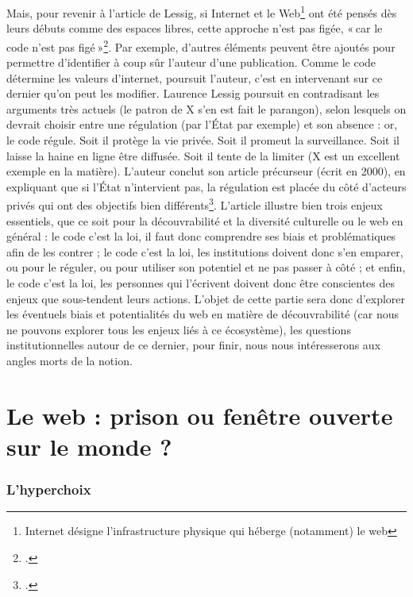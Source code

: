 Mais, pour revenir à l’article de Lessig, si Internet et le Web\footnote{Internet désigne l'infrastructure physique qui héberge (notamment) le web} ont été pensés dès leurs débuts comme des espaces libres, cette approche n’est pas figée, « car le code n’est pas figé »\footcite[§ 6]{lessig_code_2000}. Par exemple, d’autres éléments peuvent être ajoutés pour permettre d’identifier à coup sûr l’auteur d’une publication. Comme le code détermine les valeurs d’internet, poursuit l’auteur, c’est en intervenant sur ce dernier qu’on peut les modifier. Laurence Lessig poursuit en contradisant les arguments très actuels (le patron de X s’en est fait le parangon), selon lesquels on devrait choisir entre une régulation (par l’État par exemple) et son absence : or, le code régule. Soit il protège la vie privée. Soit il promeut la surveillance. Soit il laisse la haine en ligne être diffusée. Soit il tente de la limiter (X est un excellent exemple en la matière). L’auteur conclut son article précurseur (écrit en 2000), en expliquant que si l’État n’intervient pas, la régulation est placée du côté d’acteurs privés qui ont des objectifs bien différents\footcite[§ 28]{lessig_code_2000}. L’article illustre bien trois enjeux essentiels, que ce soit pour la découvrabilité et la diversité culturelle ou le web en général : le code c’est la loi, il faut donc comprendre ses biais et problématiques afin de les contrer ; le code c’est la loi, les institutions doivent donc s’en emparer, ou pour le réguler, ou pour utiliser son potentiel et ne pas passer à côté ; et enfin, le code c’est la loi, les personnes qui l’écrivent doivent donc être conscientes des enjeux que sous-tendent leurs actions. L’objet de cette partie sera donc d’explorer les éventuels biais et potentialités du web en matière de découvrabilité (car nous ne pouvons explorer tous les enjeux liés à ce écosystème), les questions institutionnelles autour de ce dernier, pour finir, nous nous intéresserons aux angles morts de la notion.

\chapter{Le web : prison ou fenêtre ouverte sur le monde ?}

\subsection{L'hyperchoix}

